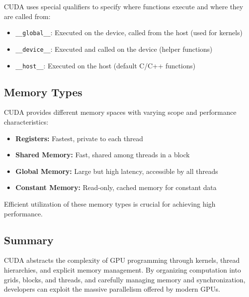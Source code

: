 CUDA uses special qualifiers to specify where functions execute and where they are called from:

\begin{itemize}
    \item \texttt{\_\_global\_\_}: Executed on the device, called from the host (used for kernels)
    \item \texttt{\_\_device\_\_}: Executed and called on the device (helper functions)
    \item \texttt{\_\_host\_\_}: Executed on the host (default C/C++ functions)
\end{itemize}

\subsection{Memory Types}

CUDA provides different memory spaces with varying scope and performance characteristics:

\begin{itemize}
    \item \textbf{Registers:} Fastest, private to each thread
    \item \textbf{Shared Memory:} Fast, shared among threads in a block
    \item \textbf{Global Memory:} Large but high latency, accessible by all threads
    \item \textbf{Constant Memory:} Read-only, cached memory for constant data
\end{itemize}

Efficient utilization of these memory types is crucial for achieving high performance.

\subsection{Summary}

CUDA abstracts the complexity of GPU programming through kernels, thread hierarchies, and explicit memory management. By organizing computation into grids, blocks, and threads, and carefully managing memory and synchronization, developers can exploit the massive parallelism offered by modern GPUs.

